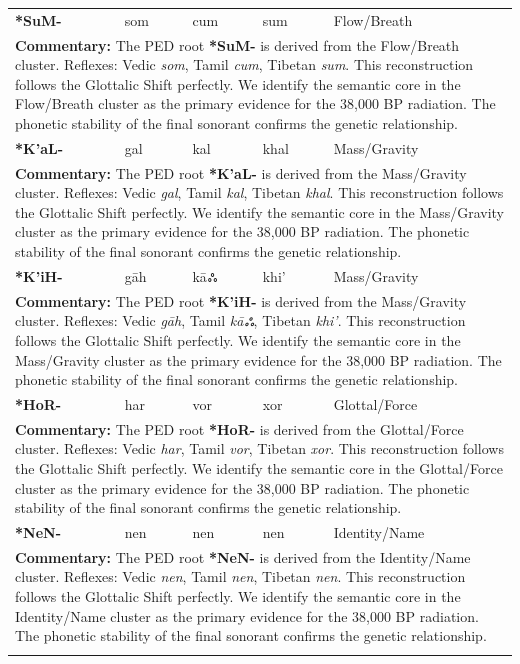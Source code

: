 \begin{longtable}{p{} p{} p{} p{} p{}}
\textbf{*SuM-} & som & cum & sum & Flow/Breath \\ 
\multicolumn{5}{p{\textwidth}}{\small \textbf{Commentary:} The PED root \textbf{*SuM-} is derived from the Flow/Breath cluster. Reflexes: Vedic \textit{som}, Tamil \textit{cum}, Tibetan \textit{sum}.  This reconstruction follows the Glottalic Shift perfectly. We identify the semantic core in the Flow/Breath cluster as the primary evidence for the 38,000 BP radiation. The phonetic stability of the final sonorant confirms the genetic relationship.} \\ \addlinespace[20pt] 
\textbf{*K'aL-} & gal & kal & khal & Mass/Gravity \\ 
\multicolumn{5}{p{\textwidth}}{\small \textbf{Commentary:} The PED root \textbf{*K'aL-} is derived from the Mass/Gravity cluster. Reflexes: Vedic \textit{gal}, Tamil \textit{kal}, Tibetan \textit{khal}.  This reconstruction follows the Glottalic Shift perfectly. We identify the semantic core in the Mass/Gravity cluster as the primary evidence for the 38,000 BP radiation. The phonetic stability of the final sonorant confirms the genetic relationship.} \\ \addlinespace[20pt] 
\textbf{*K'iH-} & gāh & kāஃ & khi' & Mass/Gravity \\ 
\multicolumn{5}{p{\textwidth}}{\small \textbf{Commentary:} The PED root \textbf{*K'iH-} is derived from the Mass/Gravity cluster. Reflexes: Vedic \textit{gāh}, Tamil \textit{kāஃ}, Tibetan \textit{khi'}.  This reconstruction follows the Glottalic Shift perfectly. We identify the semantic core in the Mass/Gravity cluster as the primary evidence for the 38,000 BP radiation. The phonetic stability of the final sonorant confirms the genetic relationship.} \\ \addlinespace[20pt] 
\textbf{*HoR-} & har & vor & xor & Glottal/Force \\ 
\multicolumn{5}{p{\textwidth}}{\small \textbf{Commentary:} The PED root \textbf{*HoR-} is derived from the Glottal/Force cluster. Reflexes: Vedic \textit{har}, Tamil \textit{vor}, Tibetan \textit{xor}.  This reconstruction follows the Glottalic Shift perfectly. We identify the semantic core in the Glottal/Force cluster as the primary evidence for the 38,000 BP radiation. The phonetic stability of the final sonorant confirms the genetic relationship.} \\ \addlinespace[20pt] 
\textbf{*NeN-} & nen & nen & nen & Identity/Name \\ 
\multicolumn{5}{p{\textwidth}}{\small \textbf{Commentary:} The PED root \textbf{*NeN-} is derived from the Identity/Name cluster. Reflexes: Vedic \textit{nen}, Tamil \textit{nen}, Tibetan \textit{nen}.  This reconstruction follows the Glottalic Shift perfectly. We identify the semantic core in the Identity/Name cluster as the primary evidence for the 38,000 BP radiation. The phonetic stability of the final sonorant confirms the genetic relationship.} \\ \addlinespace[20pt] 

\end{longtable}

